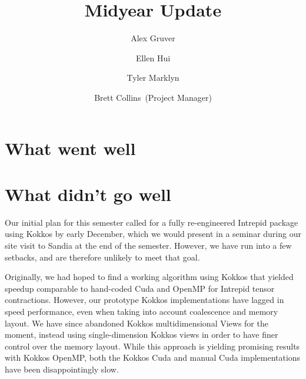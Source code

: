 \documentclass{hmcclinic}
\title{Midyear Update}
\author{Alex Gruver \and Ellen Hui \and Tyler Marklyn \and Brett Collins~(Project Manager)}
\begin{document}





\maketitle

\mainmatter




\section*{What went well}

\section*{What didn't go well}
Our initial plan for this semester called for a fully re-engineered Intrepid
package using Kokkos by early December, which we would present in a seminar
during our site visit to Sandia at the end of the semester.  However, we have
run into a few setbacks, and are therefore unlikely to meet that goal.

Originally, we had hoped to find a working algorithm using Kokkos that yielded
speedup comparable to hand-coded Cuda and OpenMP for Intrepid tensor
contractions.  However, our prototype Kokkos implementations have lagged in
speed performance, even when taking into account coalescence and memory layout.
We have since abandoned Kokkos multidimensional Views for the moment, instead
using single-dimension Kokkos views in order to have finer control over the
memory layout.  While this approach is yielding promising results with Kokkos
OpenMP, both the Kokkos Cuda and manual Cuda implementations have been
disappointingly slow.
\end{document}
